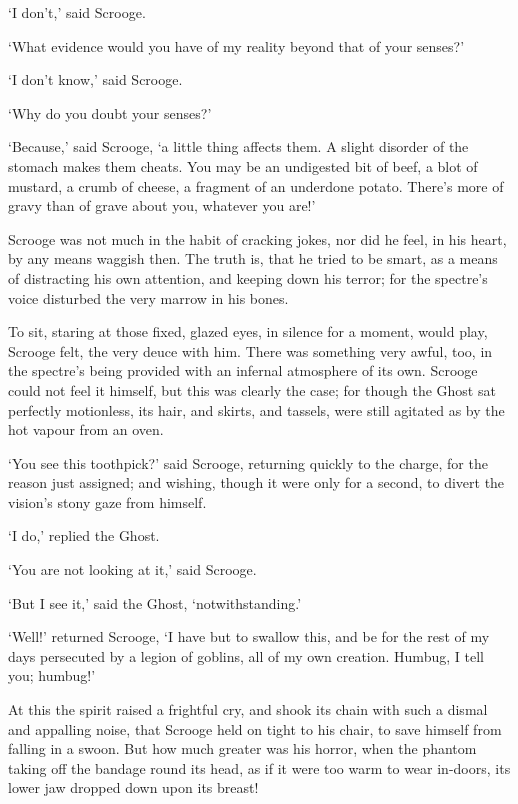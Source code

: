 \documentclass[11pt,twoside]{article}\makeatletter
\begin{document}
‘I don't,’ said Scrooge.  \par
           ‘What evidence would you have of my reality beyond that of your senses?’         \par
‘I don't know,’ said Scrooge.  \par
           ‘Why do you doubt your senses?’         \par
‘Because,’ said Scrooge, ‘a little thing affects them.  A slight disorder of the stomach makes them cheats.  You may be an undigested bit of beef, a blot of mustard, a crumb of cheese, a fragment of an underdone potato.  There's more of gravy than of grave about you, whatever you are!’  \par
Scrooge was not much in the habit of cracking jokes, nor did he feel, in his heart, by any means waggish then.  The truth is, that he tried to be smart, as a means of distracting his own attention, and keeping down his terror; for the spectre's voice disturbed the very marrow in his bones.  \par
To sit, staring at those fixed, glazed eyes, in silence for a moment, would play, Scrooge felt, the very deuce with him. There was something very awful, too, in the spectre's being provided with an infernal atmosphere of its own.  Scrooge could not feel it himself, but this was clearly the case; for though the Ghost sat perfectly motionless, its hair, and skirts, and tassels, were still agitated as by the hot vapour from an oven.  \par
‘You see this toothpick?’ said Scrooge, returning quickly to the charge, for the reason just assigned; and wishing, though it were only for a second, to divert the vision's stony gaze from himself.  \par
‘I do,’ replied the Ghost.  \par
‘You are not looking at it,’ said Scrooge.  \par
‘But I see it,’ said the Ghost, ‘notwithstanding.’  \par
‘Well!’ returned Scrooge, ‘I have but to swallow this, and be for the rest of my days persecuted by a legion of goblins, all of my own creation.  Humbug, I tell you; humbug!’  \par
At this the spirit raised a frightful cry, and shook its chain with such a dismal and appalling noise, that Scrooge held on tight to his chair, to save himself from falling in a swoon. But how much greater was his horror, when the phantom taking off the bandage round its head, as if it were too warm to wear in-doors, its lower jaw dropped down upon its breast!  \par
\end{document}
